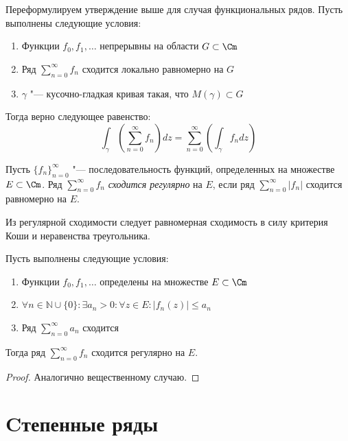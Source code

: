 \begin{note}
	Переформулируем утверждение выше для случая функциональных рядов. Пусть выполнены следующие условия:
	\begin{enumerate}
		\item Функции $f_0, f_1, \dotsc$ непрерывны на области $G \subset \Cm$
		\item Ряд $\sum_{n=0}^\infty f_n$ сходится локально равномерно на $G$
		\item $\gamma$ "--- кусочно-гладкая кривая такая, что $M(\gamma) \subset G$
	\end{enumerate}
	
	Тогда верно следующее равенство:
	\[\int_\gamma \left(\sum_{n=0}^\infty f_n\right)dz = \sum_{n=0}^\infty \left(\int_\gamma f_ndz\right)\]
\end{note}

\begin{definition}
	Пусть $\{f_n\}_{n = 0}^\infty$ "--- последовательность функций, определенных на множестве $E \subset \Cm$. Ряд $\sum_{n=0}^\infty f_n$ \textit{сходится регулярно} на $E$, если ряд $\sum_{n=0}^\infty |f_n|$ сходится равномерно на $E$.
\end{definition}

\begin{note}
	Из регулярной сходимости следует равномерная сходимость в силу критерия Коши и неравенства треугольника.
\end{note}

\begin{theorem}
	Пусть выполнены следующие условия:
	\begin{enumerate}
		\item Функции $f_0, f_1, \dotsc$ определены на множестве $E \subset \Cm$
		\item $\forall n \in \mathbb{N} \cup \{0\} : \exists a_n > 0: \forall z \in E: |f_n(z)| \le a_n$
		\item Ряд $\sum_{n=0}^\infty a_n$ сходится
	\end{enumerate}
	
	Тогда ряд $\sum_{n=0}^\infty f_n$ сходится регулярно на $E$.
\end{theorem}

\begin{proof}
	Аналогично вещественному случаю.
\end{proof}

\section{Cтепенные ряды}

